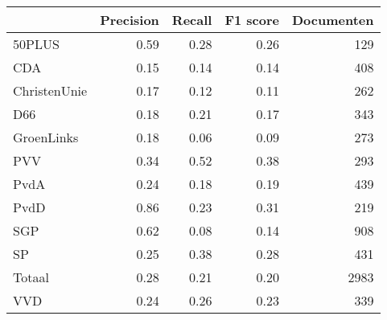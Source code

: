 \begin{tabular}{lrrrr}
\toprule
{} &  Precision &  Recall &  F1 score &  Documenten \\
\midrule
50PLUS       &       0.59 &    0.28 &      0.26 &         129 \\
CDA          &       0.15 &    0.14 &      0.14 &         408 \\
ChristenUnie &       0.17 &    0.12 &      0.11 &         262 \\
D66          &       0.18 &    0.21 &      0.17 &         343 \\
GroenLinks   &       0.18 &    0.06 &      0.09 &         273 \\
PVV          &       0.34 &    0.52 &      0.38 &         293 \\
PvdA         &       0.24 &    0.18 &      0.19 &         439 \\
PvdD         &       0.86 &    0.23 &      0.31 &         219 \\
SGP          &       0.62 &    0.08 &      0.14 &         908 \\
SP           &       0.25 &    0.38 &      0.28 &         431 \\
Totaal       &       0.28 &    0.21 &      0.20 &        2983 \\
VVD          &       0.24 &    0.26 &      0.23 &         339 \\
\bottomrule
\end{tabular}
